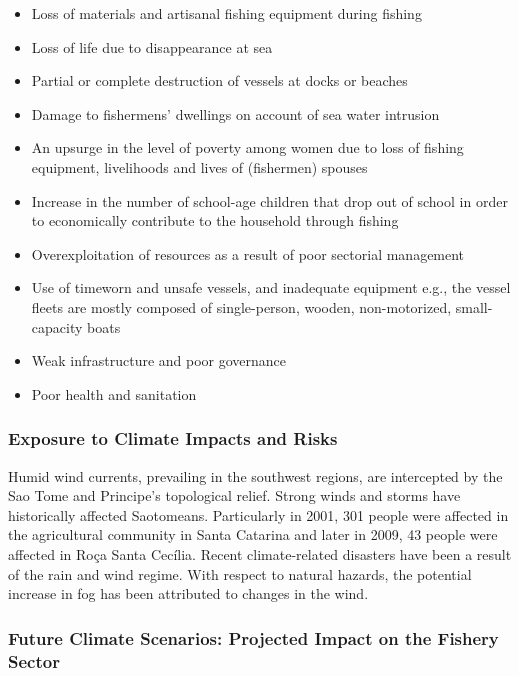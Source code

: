 \documentclass[
]{book}
\providecommand{\tightlist}{%
  \setlength{\itemsep}{0pt}\setlength{\parskip}{0pt}}
\begin{document}
\begin{itemize}
\tightlist
\item
  Loss of materials and artisanal fishing equipment during fishing
\item
  Loss of life due to disappearance at sea
\item
  Partial or complete destruction of vessels at docks or beaches
\item
  Damage to fishermens' dwellings on account of sea water intrusion
\item
  An upsurge in the level of poverty among women due to loss of fishing equipment, livelihoods and lives of (fishermen) spouses
\item
  Increase in the number of school-age children that drop out of school in order to economically contribute to the household through fishing
\item
  Overexploitation of resources as a result of poor sectorial management
\item
  Use of timeworn and unsafe vessels, and inadequate equipment e.g., the vessel fleets are mostly composed of single-person, wooden, non-motorized, small-capacity boats
\item
  Weak infrastructure and poor governance
\item
  Poor health and sanitation
\end{itemize}

\hypertarget{exposure-to-climate-impacts-and-risks-11}{%
\subsubsection{Exposure to Climate Impacts and Risks}\label{exposure-to-climate-impacts-and-risks-11}}

Humid wind currents, prevailing in the southwest regions, are intercepted by the Sao Tome and Principe's topological relief. Strong winds and storms have historically affected Saotomeans. Particularly in 2001, 301 people were affected in the agricultural community in Santa Catarina and later in 2009, 43 people were affected in Roça Santa Cecília. Recent climate-related disasters have been a result of the rain and wind regime. With respect to natural hazards, the potential increase in fog has been attributed to changes in the wind.

\hypertarget{future-climate-scenarios-projected-impact-on-the-fishery-sector-1}{%
\subsubsection{Future Climate Scenarios: Projected Impact on the Fishery Sector}\label{future-climate-scenarios-projected-impact-on-the-fishery-sector-1}}
\end{document}
